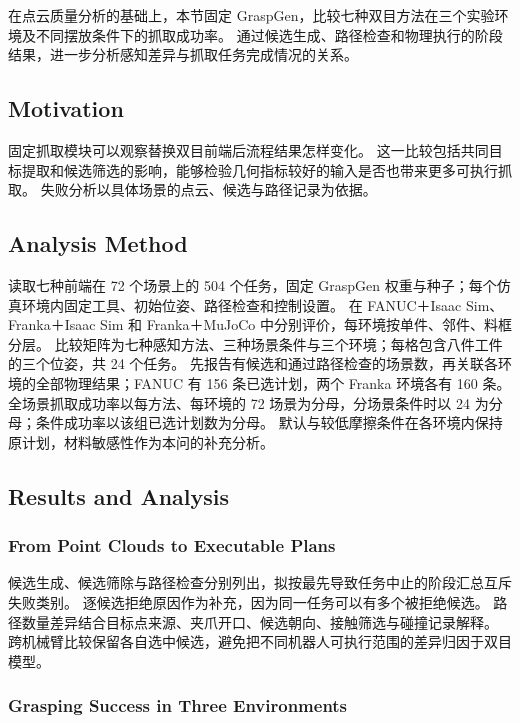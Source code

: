 \documentclass[UTF8,fontset=fandol,a4paper,11pt]{ctexart}
\newcommand{\qyb}[1]{\textcolor{red!75!black}{#1}}
\begin{document}
在点云质量分析的基础上，本节固定 GraspGen，比较七种双目方法在三个实验环境及不同摆放条件下的抓取成功率。
通过候选生成、路径检查和物理执行的阶段结果，进一步分析感知差异与抓取任务完成情况的关系。

\subsection{\qyb{Motivation}}

固定抓取模块可以观察替换双目前端后流程结果怎样变化。
这一比较包括共同目标提取和候选筛选的影响，能够检验几何指标较好的输入是否也带来更多可执行抓取。
失败分析以具体场景的点云、候选与路径记录为依据。

\subsection{\qyb{Analysis Method}}

读取七种前端在 72 个场景上的 504 个任务，固定 GraspGen 权重与种子；每个仿真环境内固定工具、初始位姿、路径检查和控制设置。
在 FANUC＋Isaac Sim、Franka＋Isaac Sim 和 Franka＋MuJoCo 中分别评价，每环境按单件、邻件、料框分层。
比较矩阵为七种感知方法、三种场景条件与三个环境；每格包含八件工件的三个位姿，共 24 个任务。
先报告有候选和通过路径检查的场景数，再关联各环境的全部物理结果；FANUC 有 156 条已选计划，两个 Franka 环境各有 160 条。
全场景抓取成功率以每方法、每环境的 72 场景为分母，分场景条件时以 24 为分母；条件成功率以该组已选计划数为分母。
默认与较低摩擦条件在各环境内保持原计划，材料敏感性作为本问的补充分析。

\subsection{\qyb{Results and Analysis}}

\subsubsection{From Point Clouds to Executable Plans}

候选生成、候选筛除与路径检查分别列出，拟按最先导致任务中止的阶段汇总互斥失败类别。
逐候选拒绝原因作为补充，因为同一任务可以有多个被拒绝候选。
路径数量差异结合目标点来源、夹爪开口、候选朝向、接触筛选与碰撞记录解释。
跨机械臂比较保留各自选中候选，避免把不同机器人可执行范围的差异归因于双目模型。

\subsubsection{Grasping Success in Three Environments}
\end{document}
